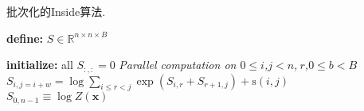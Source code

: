 \begin{algorithm}[tb]
  \caption{批次化的Inside算法.}
  \begin{algorithmic}[1]
    \setlength{\commentindent}{.3\textwidth}
    \setlength{\algorithmicindent}{1.5em}
    \renewcommand{\algorithmiccomment}[1]{\unskip\hfill\makebox[\commentindent][l]{$\rhd$~#1}\par}
    \LetLtxMacro{\oldalgorithmic}{\algorithmic}
    \renewcommand{\algorithmic}[1][0]{%
      \oldalgorithmic[#1]%
      \renewcommand{\ALC@com}[1]{%
        \ifnum\pdfstrcmp{##1}{default}=0\else\algorithmiccomment{##1}\fi}%
    }
    \STATE \textbf{define:} $S \in \mathbb{R}^{n \times n \times B}$ 

    \STATE \textbf{initialize:} all $S_{:, :} = 0$
    \STATE \emph{Parallel computation on $0 \le i$,$j<n$,$~r$,$0\le b<B$}
    \STATE $S_{i, j=i+w} = \log \sum\limits_{i \le r < j} \exp \left( S_{i, r}+S_{r+1, j} \right)  + \mathrm{s}(i, j) $ \label{line:sum-product}\\
    \ENDFOR
    \RETURN $S_{0, n-1} \equiv \log Z(\boldsymbol{x})$
  \end{algorithmic}
  \label{alg:inside}
\end{algorithm}
